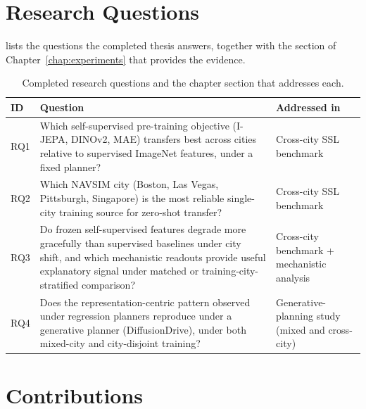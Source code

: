 \section{Research Questions}
\label{sec:research-questions}

 lists the questions the completed thesis answers, together with the section of Chapter~\ref{chap:experiments} that provides the evidence.

\begin{table}[ht]
\centering
\caption{Completed research questions and the chapter section that addresses each.}
\label{tab:intro-rqs}
\small
\setlength{\tabcolsep}{6pt}
\renewcommand{\arraystretch}{1.25}
\begin{tabular}{@{}>{\raggedright\arraybackslash}p{1.1cm} >{\raggedright\arraybackslash}p{7.5cm} >{\raggedright\arraybackslash}p{4.2cm}@{}}
\toprule
\textbf{ID} & \textbf{Question} & \textbf{Addressed in} \\
\midrule
RQ1 & Which self-supervised pre-training objective (I-JEPA, DINOv2, MAE) transfers best across cities relative to supervised ImageNet features, under a fixed planner? & Cross-city SSL benchmark \\
RQ2 & Which NAVSIM city (Boston, Las Vegas, Pittsburgh, Singapore) is the most reliable single-city training source for zero-shot transfer? & Cross-city SSL benchmark \\
RQ3 & Do frozen self-supervised features degrade more gracefully than supervised baselines under city shift, and which mechanistic readouts provide useful explanatory signal under matched or training-city-stratified comparison? & Cross-city benchmark + mechanistic analysis \\
RQ4 & Does the representation-centric pattern observed under regression planners reproduce under a generative planner (DiffusionDrive), under both mixed-city and city-disjoint training? & Generative-planning study (mixed and cross-city) \\
\bottomrule
\end{tabular}
\end{table}

\section{Contributions}
\label{sec:contributions}


